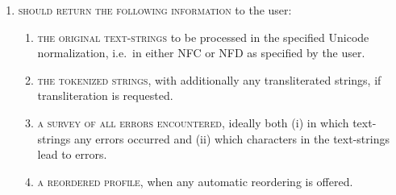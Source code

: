 \begin{enumerate}
\begin{enumerate}
        function universally in the same way across orthographies.\footnote{For example 
		compare the different first-letter capitalization practices of the digraphs 
		<ǋ> and <Ĳ> (single-character ligatures in the Unicode Standard) 
		in the Latin-based scripts of Southern-Slavic languages and 
		Dutch, respectively.} Ideally,
        users should prepare orthography profiles with all lowercase and
        uppercase variants explicitly mentioned, so by default no case matching
        should be performed. 
		\item \textsc{to treat the profile literally}, i.e.~to not interpret regular
        expression metacharacters. Matching graphemes literally often leads to
        significant speed increase, and ensures that users do not have to worry
        about escaping metacharacters. However, in our experience all actually
        interesting use cases of orthography profiles include some contexts,
        which automatically prevents any literal interpretation.
    \end{enumerate}
	\item \textsc{should return the following information} to the user:
	\begin{enumerate}
		\def\labelenumii{C\arabic{enumii}.} \setcounter{enumii}{8} 
		\item \textsc{the original text-strings} to be processed in the specified
        Unicode normalization, i.e.~in either NFC or NFD as specified by the
        user. 
		\item \textsc{the tokenized strings}, with additionally any transliterated
        strings, if transliteration is requested. 
		\item \textsc{a survey of all errors encountered}, ideally both (i) in which
        text-strings any errors occurred and (ii) which characters in the
        text-strings lead to errors. 
		\item \textsc{a reordered profile}, when any automatic reordering is offered. 
	\end{enumerate}
\end{enumerate}

